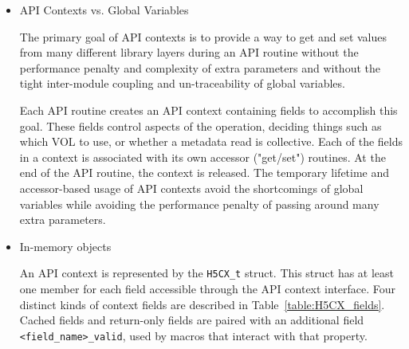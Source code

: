 \begin{itemize}

\item API Contexts vs. Global Variables

The primary goal of API contexts is to provide a way to get and set values from many different library layers during an API routine without the performance penalty and complexity of extra parameters and without the tight inter-module coupling and un-traceability of global variables.

Each API routine creates an API context containing fields to accomplish this goal. These fields control aspects of the operation, deciding things such as which VOL to use, or whether a metadata read is collective. Each of the fields in a context is associated with its own accessor ("get/set") routines. At the end of the API routine, the context is released. The temporary lifetime and accessor-based usage of API contexts avoid the shortcomings of global variables while avoiding the performance penalty of passing around many extra parameters.

\item In-memory objects

An API context is represented by the \texttt{H5CX\_t} struct. This struct has at least one member for each field accessible through the API context interface. Four distinct kinds of context fields are described in Table~\ref{table:H5CX_fields}. Cached fields and return-only fields are paired with an additional field \texttt{<field\_name>\_valid}, used by macros that interact with that property.


\end{itemize}
